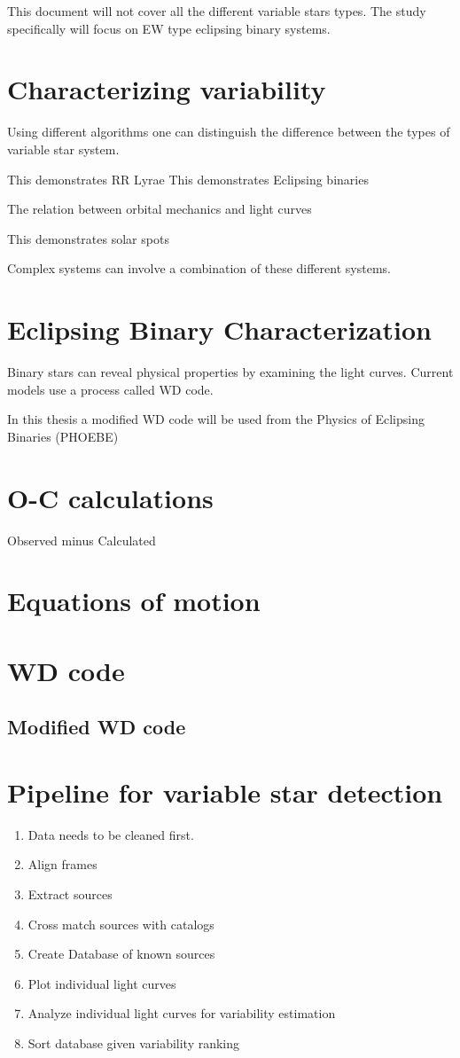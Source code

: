 This document will not cover all the different variable stars types. 
The study specifically will focus on EW type eclipsing binary systems.  

\section{Characterizing variability}
Using different algorithms one can distinguish the difference between the types of variable star system.

This demonstrates RR Lyrae
This demonstrates Eclipsing binaries

The relation between orbital mechanics and light curves

This demonstrates solar spots

Complex systems can involve a combination of these different systems.

\section{Eclipsing Binary Characterization}
Binary stars can reveal physical properties by examining the light curves.
Current models use a process called WD code.

In this thesis a modified WD code will be used from the Physics of Eclipsing Binaries (PHOEBE)

\section{O-C calculations}
Observed minus Calculated

\section{Equations of motion}

\section{WD code}
\subsection{Modified WD code}

\section{Pipeline for variable star detection}
\begin{enumerate}
    \item Data needs to be cleaned first.
    \item Align frames
    \item Extract sources
    \item Cross match sources with catalogs
    \item Create Database of known sources
    \item Plot individual light curves
    \item Analyze individual light curves for variability estimation
    \item Sort database given variability ranking
\end{enumerate}




